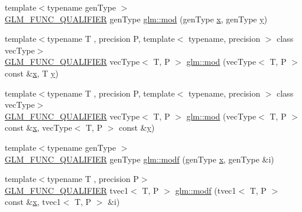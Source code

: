 \begin{DoxyCompactItemize}
\item 
{\footnotesize template$<$typename gen\+Type $>$ }\\\mbox{\hyperlink{setup_8hpp_a33fdea6f91c5f834105f7415e2a64407}{G\+L\+M\+\_\+\+F\+U\+N\+C\+\_\+\+Q\+U\+A\+L\+I\+F\+I\+ER}} gen\+Type \mbox{\hyperlink{group__core__func__common_ga12201563ef902e3b07e0d1d7656efdb1}{glm\+::mod}} (gen\+Type \mbox{\hyperlink{glad_8h_a92d0386e5c19fb81ea88c9f99644ab1d}{x}}, gen\+Type \mbox{\hyperlink{glad_8h_a66ddd433d2cacfe27f5906b7e86faeed}{y}})
\item 
{\footnotesize template$<$typename T , precision P, template$<$ typename, precision $>$ class vec\+Type$>$ }\\\mbox{\hyperlink{setup_8hpp_a33fdea6f91c5f834105f7415e2a64407}{G\+L\+M\+\_\+\+F\+U\+N\+C\+\_\+\+Q\+U\+A\+L\+I\+F\+I\+ER}} vec\+Type$<$ T, P $>$ \mbox{\hyperlink{group__gtc__integer_ga1d3f62c015315540cebf1f915b67dd9c}{glm\+::mod}} (vec\+Type$<$ T, P $>$ const \&\mbox{\hyperlink{glad_8h_a92d0386e5c19fb81ea88c9f99644ab1d}{x}}, T \mbox{\hyperlink{glad_8h_a66ddd433d2cacfe27f5906b7e86faeed}{y}})
\item 
{\footnotesize template$<$typename T , precision P, template$<$ typename, precision $>$ class vec\+Type$>$ }\\\mbox{\hyperlink{setup_8hpp_a33fdea6f91c5f834105f7415e2a64407}{G\+L\+M\+\_\+\+F\+U\+N\+C\+\_\+\+Q\+U\+A\+L\+I\+F\+I\+ER}} vec\+Type$<$ T, P $>$ \mbox{\hyperlink{group__gtc__integer_ga689e2d9100af0bfc4d9954c96221095e}{glm\+::mod}} (vec\+Type$<$ T, P $>$ const \&\mbox{\hyperlink{glad_8h_a92d0386e5c19fb81ea88c9f99644ab1d}{x}}, vec\+Type$<$ T, P $>$ const \&\mbox{\hyperlink{glad_8h_a66ddd433d2cacfe27f5906b7e86faeed}{y}})
\item 
{\footnotesize template$<$typename gen\+Type $>$ }\\\mbox{\hyperlink{setup_8hpp_a33fdea6f91c5f834105f7415e2a64407}{G\+L\+M\+\_\+\+F\+U\+N\+C\+\_\+\+Q\+U\+A\+L\+I\+F\+I\+ER}} gen\+Type \mbox{\hyperlink{group__core__func__common_ga85e33f139b8db1b39b590a5713b9e679}{glm\+::modf}} (gen\+Type \mbox{\hyperlink{glad_8h_a92d0386e5c19fb81ea88c9f99644ab1d}{x}}, gen\+Type \&i)
\item 
{\footnotesize template$<$typename T , precision P$>$ }\\\mbox{\hyperlink{setup_8hpp_a33fdea6f91c5f834105f7415e2a64407}{G\+L\+M\+\_\+\+F\+U\+N\+C\+\_\+\+Q\+U\+A\+L\+I\+F\+I\+ER}} tvec1$<$ T, P $>$ \mbox{\hyperlink{namespaceglm_a41834d29828f9832a3c79931c9043ccf}{glm\+::modf}} (tvec1$<$ T, P $>$ const \&\mbox{\hyperlink{glad_8h_a92d0386e5c19fb81ea88c9f99644ab1d}{x}}, tvec1$<$ T, P $>$ \&i)

\end{DoxyCompactItemize}
